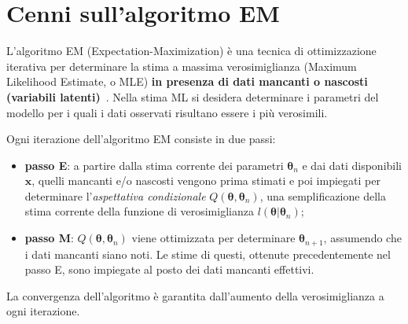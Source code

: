\section[Cenni sull'algoritmo EM]{Cenni sull'algoritmo EM}
L'algoritmo EM (Expectation-Maximization) è una tecnica di ottimizzazione iterativa per determinare la stima a massima verosimiglianza (Maximum Likelihood Estimate, o MLE) \textbf{in presenza di dati mancanti o nascosti (variabili latenti)}~\cite{paper_EM}. Nella stima ML si desidera determinare i parametri del modello per i quali i dati osservati risultano essere i più verosimili. \par Ogni iterazione dell'algoritmo EM consiste in due passi:
\begin{itemize}
	\item \textbf{passo E}: a partire dalla stima corrente dei parametri $\boldsymbol{\theta}_n$ e dai dati disponibili $\mathbf{x}$, quelli mancanti e/o nascosti vengono prima stimati e poi impiegati per determinare l'\textit{aspettativa condizionale} $Q(\boldsymbol{\theta},\boldsymbol{\theta}_n)$, una semplificazione della stima corrente della funzione di verosimiglianza $l(\boldsymbol{\theta}|\boldsymbol{\theta}_n)$;
	\item \textbf{passo M}: $Q(\boldsymbol{\theta},\boldsymbol{\theta}_n)$ viene ottimizzata per determinare $\boldsymbol{\theta}_{n+1}$, assumendo che i dati mancanti siano noti. Le stime di questi, ottenute precedentemente nel passo E, sono impiegate al posto dei dati mancanti effettivi.
\end{itemize}
La convergenza dell'algoritmo è garantita dall'aumento della verosimiglianza a ogni iterazione.

